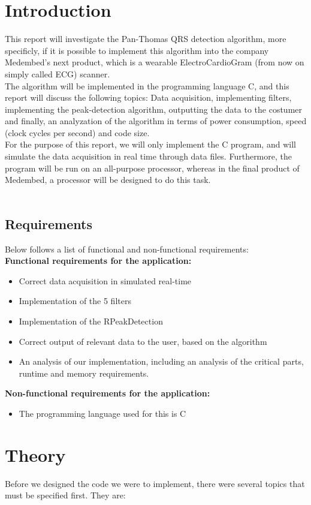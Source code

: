\documentclass[12pt,a4paper]{article}
\begin{document}
\section{Introduction}
	This report will investigate the Pan-Thomas QRS detection algorithm, more specificly, if it is possible to implement this algorithm into the company Medembed's next product, which is a wearable ElectroCardioGram (from now on simply called ECG) scanner.\\
	The algorithm will be implemented in the programming language C, and this report will discuss the following topics: Data acquisition, implementing filters, implementing the peak-detection algorithm, outputting the data to the costumer and finally, an analyzation of the algorithm in terms of power consumption, speed (clock cycles per second) and code size.\\
	For the purpose of this report, we will only implement the C program, and will simulate the data acquisition in real time through data files. Furthermore, the program will be run on an all-purpose processor, whereas in the final product of Medembed, a processor will be designed to do this task.\\
\\
\subsection{Requirements}
Below follows a list of functional and non-functional requirements:\\

\textbf{ Functional requirements for the application:}
\begin{itemize}
	\item Correct data acquisition in simulated real-time
	\item Implementation of the 5 filters
	\item Implementation of the RPeakDetection
	\item Correct output of relevant data to the user, based on the algorithm
	\item An analysis of our implementation, including an analysis of the critical parts, runtime and memory requirements.
\end{itemize}
\textbf{Non-functional requirements for the application:}
\begin {itemize}
	\item The programming language used for this is C
\end{itemize}

\section{Theory}
 	Before we designed the code we were to implement, there were several topics that must be specified first. They are:\\
 	
\end{document}
